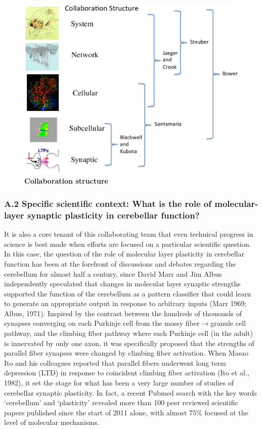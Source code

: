 \documentclass[12pt]{article}
\begin{document}
\begin{figure}
\centering
\includegraphics[scale=0.56]{figures/collaboration-structure.eps}
\caption{\footnotesize {\bf Collaboration structure}}
\label{fig:collaboration-structure}
\end{figure}

\subsubsection*{A.2 Specific scientific context: What is the role of molecular-layer synaptic plasticity in cerebellar function?}

\noindent It is also a core tenant of this collaborating team that even technical progress in science is best made when efforts are focused on a particular scientific question. In this case, the question of the role of molecular layer plasticity in cerebellar function has been at the forefront of discussions and debates regarding the cerebellum for almost half a century, since David Marr and Jim Albus independently speculated that changes in molecular layer synaptic strengths supported the function of the cerebellum as a pattern classifier that could learn to generate an appropriate output in response to arbitrary inputs (Marr 1969; Albus, 1971). Inspired by the contrast between the hundreds of thousands of synapses converging on each Purkinje cell from the mossy fiber$\rightarrow$granule cell pathway, and the climbing fiber pathway where each Purkinje cell (in the adult) is innervated by only one axon, it was specifically proposed that the strengths of parallel fiber synapses were changed by climbing fiber activation. When Masao Ito and his colleagues reported that parallel fibers underwent long term depression (LTD) in response to coincident climbing fiber activation (Ito et al., 1982), it set the stage for what has been a very large number of studies of cerebellar synaptic plasticity. In fact, a recent Pubmed search with the key words `cerebellum' and `plasticity' revealed more than 100 peer reviewed scientific papers published since the start of 2011 alone, with almost 75\% focused at the level of molecular mechanisms.
\end{document}
